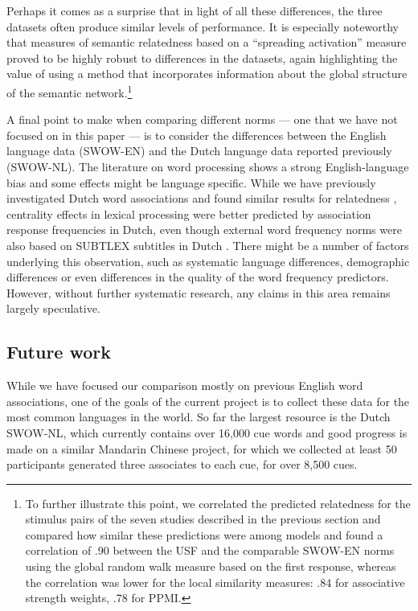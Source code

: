 \documentclass[a4paper,doc,natbib,floatsintext]{apa6}
\begin{document}
Perhaps it comes as a surprise that in light of all these differences, the three datasets often produce similar levels of performance. It is especially noteworthy that measures of semantic relatedness based on a ``spreading activation'' measure proved to be highly robust to differences in the datasets, again highlighting the value of using a method that incorporates information about the global structure of the semantic network.\footnote{To further illustrate this point, we correlated the predicted relatedness for the stimulus pairs of the seven studies described in the previous section and compared how similar these predictions were among models and found a correlation of .90 between the USF and the comparable SWOW-EN norms using the global random walk measure based on the first response, whereas the correlation was lower for the local similarity measures: .84 for associative strength weights, .78 for PPMI.}

A final point to make when comparing different norms --- one that we have not focused on in this paper --- is to consider the differences between the English language data (SWOW-EN) and the Dutch language data reported previously (SWOW-NL). The literature on word processing shows a strong English-language bias and some effects might be language specific. While we have previously investigated Dutch word associations and found similar results for relatedness \citep{DeDeyne2016JEP,DeDeyne2014CorpusSize}, centrality effects in lexical processing were better predicted by association response frequencies in Dutch, even though external word frequency norms were also based on SUBTLEX subtitles in Dutch \citep{DeDeyne2013}. There might be a number of factors underlying this observation, such as systematic language differences, demographic differences or even differences in the quality of the word frequency predictors. However, without further systematic research, any claims in this area remains largely speculative.


\subsection{Future work}
While we have focused our comparison mostly on previous English word associations, one of the goals of the current project is to collect these data for the most common languages in the world.
So far the largest resource is the Dutch SWOW-NL, which currently contains over 16,000 cue words and good progress is made on a similar Mandarin Chinese project, for which we collected at least 50 participants generated three associates to each cue, for over 8,500 cues.
\end{document}
